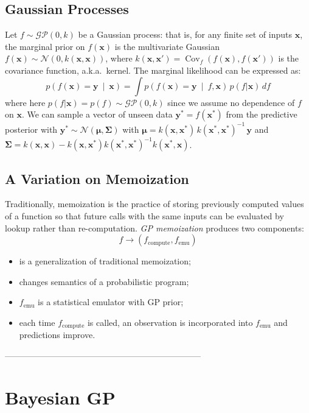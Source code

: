 \documentclass[a0,portrait]{a0poster}
\newcommand{\compute}{{\textrm{compute}}}
\newcommand{\emu}{{\textrm{emu}}}
\newcommand{\xbf}{\mathbf{x}}
\newcommand{\ybf}{\mathbf{y}}
\newcommand{\pn}[1]{\left( #1 \right)}
\newcommand{\mvert}{\ \middle\vert\ }
\DeclareMathOperator*{\Cov}{Cov}
\begin{document}
\begin{multicols}{2}
\subsection*{Gaussian Processes}
Let $f \sim \mathcal{GP}(0,k)$ be a Gaussian process: that is, for any finite set of inputs $\xbf$, the marginal prior on $f(\xbf)$ is the multivariate Gaussian $f(\xbf) \sim \mathcal{N}(0, k(\xbf,\xbf))$,
where $k(\xbf,\xbf') = \Cov_f\pn{f(\xbf), f(\xbf')}$ is the covariance function, a.k.a.\ kernel.
The marginal likelihood can be expressed as:
\begin{equation*}
\label{eq:marg}
p\pn{f(\xbf) = \ybf \mvert \xbf} = \int p\pn{f(\xbf) = \ybf \mvert f, \xbf}\, p(f|\xbf) \, df
\end{equation*}
where here $p(f|\xbf) = p(f) \sim \mathcal{GP}(0,k)$ since we assume no dependence of $f$ on $\xbf$.
We can sample a vector of unseen data $\ybf^* = f(\xbf^*)$ from the predictive posterior with
$\ybf^* \sim \mathcal{N}(\bm{\mu},\bm{\Sigma})$
with $\bm{\mu} = k(\xbf,\xbf^*)\, k(\xbf^*,\xbf^*)^{-1}\, \ybf$ and $\bm{\Sigma} =  k(\xbf,\xbf) - k(\xbf,\xbf^*)k(\xbf^*,\xbf^*)^{-1} k(\xbf^*,\xbf)$.

\subsection*{A Variation on Memoization}
Traditionally, memoization is the practice of storing previously computed values of a function so that future calls
with the same inputs can be evaluated by lookup rather than re-computation. {\em GP memoization} produces two components:
\[ f \to (f_\compute, f_\emu) \]
\begin{itemize}
\setlength{\itemindent}{1cm}
 \item is a generalization of traditional memoization;
 \item changes semantics of a probabilistic program;
 \item $f_\emu$ is a statistical emulator with GP prior;
 \item each time $f_\compute$ is called, an observation is incorporated into $f_\emu$ and predictions improve.
\end{itemize}


---------------------------------------------------------------------


\section*{Bayesian GP}


\end{multicols}
\end{document}
